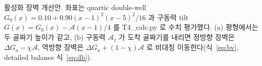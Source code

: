 \caption{활성화 장벽 개선안. 좌표는 quartic double-well $G_0(x)=0.10+0.90(x-1)^2(x-5)^2/16$ 과
구동력 tilt $G(x)=G_0(x)-\mathcal A(x-1)/4$ 를 T4\_calc.py 로 수치 평가했다. (a) 평형에서는 두 골짜기 높이가 같고,
(b) 구동력 $\mathcal A_j$ 가 도착 골짜기를 내리면 정방향 장벽은 $\Delta G_a-\chi\mathcal A$, 역방향 장벽은
$\Delta G_a+(1-\chi)\mathcal A$ 로 비대칭 이동한다(식~\eqref{eq:bv}, detailed balance 식~\eqref{eq:db}).}
\label{fig:barrier}
